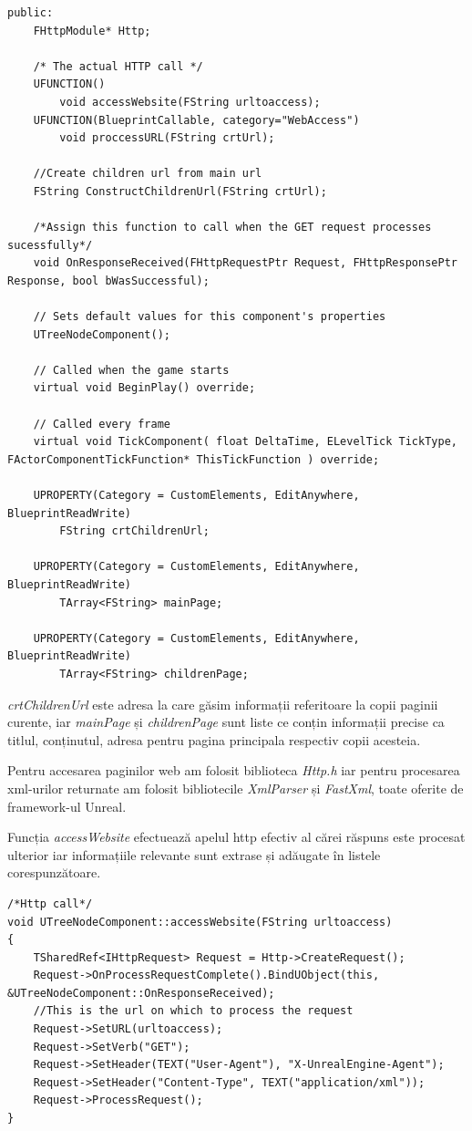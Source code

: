 \begin{lstlisting}[breaklines=true, postbreak=\mbox{\textcolor{red}{$\hookrightarrow$}\space}, caption=Snippet din fișierul header al componentei \textit{TreeNode} în care sunt declarate componentele esențiale utilizate în blueprint-uri]
public:	
	FHttpModule* Http;

	/* The actual HTTP call */
	UFUNCTION()
		void accessWebsite(FString urltoaccess);
	UFUNCTION(BlueprintCallable, category="WebAccess")
		void proccessURL(FString crtUrl);

	//Create children url from main url
	FString ConstructChildrenUrl(FString crtUrl);

	/*Assign this function to call when the GET request processes sucessfully*/
	void OnResponseReceived(FHttpRequestPtr Request, FHttpResponsePtr Response, bool bWasSuccessful);

	// Sets default values for this component's properties
	UTreeNodeComponent();

	// Called when the game starts
	virtual void BeginPlay() override;
	
	// Called every frame
	virtual void TickComponent( float DeltaTime, ELevelTick TickType, FActorComponentTickFunction* ThisTickFunction ) override;

	UPROPERTY(Category = CustomElements, EditAnywhere, BlueprintReadWrite)
		FString crtChildrenUrl;

	UPROPERTY(Category = CustomElements, EditAnywhere, BlueprintReadWrite)
		TArray<FString> mainPage;

	UPROPERTY(Category = CustomElements, EditAnywhere, BlueprintReadWrite)
		TArray<FString> childrenPage;
\end{lstlisting}

\textit{crtChildrenUrl} este adresa la care găsim informații referitoare la copii paginii curente, iar \textit{mainPage} și \textit{childrenPage} sunt liste ce conțin informații precise ca titlul, conținutul, adresa pentru pagina principala respectiv copii acesteia.

Pentru accesarea paginilor web am folosit biblioteca \textit{Http.h} iar pentru procesarea xml-urilor returnate am folosit bibliotecile \textit{XmlParser} și \textit{FastXml}, toate oferite de framework-ul Unreal.

Funcția \textit{accessWebsite} efectuează apelul http efectiv al cărei răspuns este procesat ulterior iar informațiile relevante sunt extrase și adăugate în listele corespunzătoare.

\begin{lstlisting}[breaklines=true, postbreak=\mbox{\textcolor{red}{$\hookrightarrow$}\space}, caption=Funcția ce efectuează apelul http]
/*Http call*/
void UTreeNodeComponent::accessWebsite(FString urltoaccess)
{
	TSharedRef<IHttpRequest> Request = Http->CreateRequest();
	Request->OnProcessRequestComplete().BindUObject(this, &UTreeNodeComponent::OnResponseReceived);
	//This is the url on which to process the request
	Request->SetURL(urltoaccess);
	Request->SetVerb("GET");
	Request->SetHeader(TEXT("User-Agent"), "X-UnrealEngine-Agent");
	Request->SetHeader("Content-Type", TEXT("application/xml"));
	Request->ProcessRequest();
}
\end{lstlisting}

